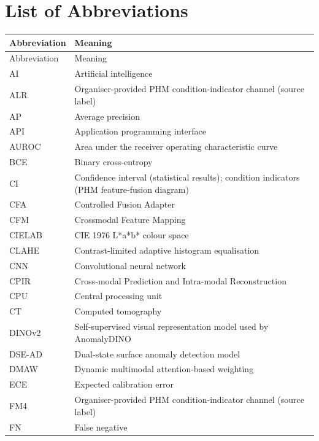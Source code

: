 \chapter*{List of Abbreviations}

\begingroup
\small\singlespacing
\setlength{\LTleft}{0pt}
\setlength{\LTright}{\fill}
\begin{longtable}{@{}P{.20\textwidth}P{.74\textwidth}@{}}
\toprule
Abbreviation & Meaning \\
\midrule\endfirsthead
\toprule
Abbreviation & Meaning \\
\midrule\endhead
\bottomrule\endfoot
AI & Artificial intelligence \\
ALR & Organiser-provided PHM condition-indicator channel (source label) \\
AP & Average precision \\
API & Application programming interface \\
AUROC & Area under the receiver operating characteristic curve \\
BCE & Binary cross-entropy \\
CI & Confidence interval (statistical results); condition indicators (PHM feature-fusion diagram) \\
CFA & Controlled Fusion Adapter \\
CFM & Crossmodal Feature Mapping \\
CIELAB & CIE 1976 L*a*b* colour space \\
CLAHE & Contrast-limited adaptive histogram equalisation \\
CNN & Convolutional neural network \\
CPIR & Cross-modal Prediction and Intra-modal Reconstruction \\
CPU & Central processing unit \\
CT & Computed tomography \\
DINOv2 & Self-supervised visual representation model used by AnomalyDINO \\
DSE-AD & Dual-state surface anomaly detection model \\
DMAW & Dynamic multimodal attention-based weighting \\
ECE & Expected calibration error \\
FM4 & Organiser-provided PHM condition-indicator channel (source label) \\
FN & False negative \\

\end{longtable}
